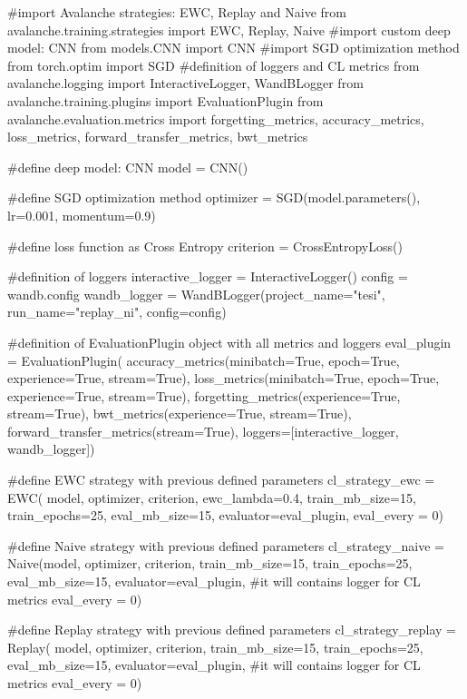 \documentclass[english, LaM, oneside]{sapthesis}%
\begin{document}
\begin{pythoncode}

#import Avalanche strategies: EWC, Replay and Naive
from avalanche.training.strategies import EWC, Replay, Naive
#import custom deep model: CNN
from models.CNN import CNN
#import SGD optimization method
from torch.optim import SGD
#definition of loggers and CL metrics
from avalanche.logging import InteractiveLogger, WandBLogger
from avalanche.training.plugins import EvaluationPlugin
from avalanche.evaluation.metrics import forgetting_metrics, accuracy_metrics, 
loss_metrics, forward_transfer_metrics, bwt_metrics

#define deep model: CNN
model = CNN()

#define SGD optimization method
optimizer = SGD(model.parameters(), lr=0.001, momentum=0.9)

#define loss function as Cross Entropy
criterion = CrossEntropyLoss()

#definition of loggers
interactive_logger = InteractiveLogger()
config = wandb.config
wandb_logger = WandBLogger(project_name="tesi", run_name="replay_ni", 
                               config=config)
                               
#definition of EvaluationPlugin object with all metrics and loggers
eval_plugin = EvaluationPlugin(
                accuracy_metrics(minibatch=True, epoch=True, experience=True, 
                stream=True), 
                loss_metrics(minibatch=True, epoch=True, experience=True, 
                stream=True), 
                forgetting_metrics(experience=True, stream=True), 
                bwt_metrics(experience=True, stream=True),
                forward_transfer_metrics(stream=True),
                loggers=[interactive_logger, wandb_logger])
                
#define EWC strategy with previous defined parameters
cl_strategy_ewc = EWC(
            model, optimizer, criterion, ewc_lambda=0.4,
            train_mb_size=15, train_epochs=25, eval_mb_size=15,
            evaluator=eval_plugin, 
            eval_every = 0)

#define Naive strategy with previous defined parameters
cl_strategy_naive = Naive(model, optimizer, criterion, 
            train_mb_size=15, train_epochs=25, eval_mb_size=15,
            evaluator=eval_plugin, #it will contains logger for CL metrics
            eval_every = 0)

#define Replay strategy with previous defined parameters            
cl_strategy_replay = Replay( model, optimizer, criterion,
            train_mb_size=15, train_epochs=25, eval_mb_size=15,
            evaluator=eval_plugin, #it will contains logger for CL metrics
            eval_every = 0)

\end{pythoncode}
\end{document}
